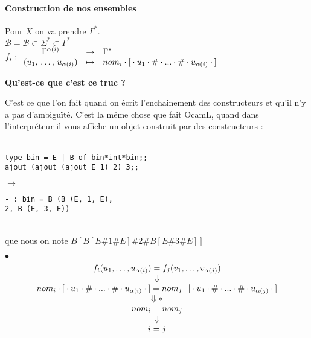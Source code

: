 \paragraph{Construction de nos ensembles}

Pour $X$ on va prendre $\Gamma^*$.\\

$\mathcal B = \mathcal B \subset \Sigma^* \subset \Gamma^*$\\

$f_i : \begin{array}{cll}
	\Gamma^{\alpha(i)} & \to & \Gamma^*\\
	(u_1, \, \dots, \, u_{\alpha(i)}) & \mapsto & nom_i \cdot \text [ \cdot u_1 \cdot \# \cdot  ... \cdot \# \cdot u_{\alpha(i)} \cdot \text ]
\end{array}$\\

\begin{rem}
\textbf{Qu'est-ce que c'est ce truc ?}

C'est ce que l'on fait quand on écrit l'enchainement des constructeurs et qu'il n'y a pas d'ambiguïté. C'est la même chose que fait OcamL, quand dans l'interpréteur il vous affiche un objet construit par des constructeurs :\\\\
\begin{minipage}{0.5\linewidth}
	\begin{lstlisting}
type bin = E | B of bin*int*bin;;
ajout (ajout (ajout E 1) 2) 3;;
\end{lstlisting}
\end{minipage} \enspace $\to$ \enspace \begin{minipage}{0.4\linewidth}
\begin{lstlisting}
- : bin = B (B (E, 1, E),
2, B (E, 3, E))
\end{lstlisting}
\end{minipage}\\que nous on note $B[B[E\#1\#E]\#2\#B[E\#3\#E]]$
\end{rem}
$\bullet$ $$\begin{array}{cl}
 f_i(u_1, \dots, u_{\alpha(i)}) = f_j(v_1, \dots, v_{\alpha(j)})  \\
 \Downarrow \\
  nom_i \cdot \text [ \cdot u_1 \cdot \# \cdot  ... \cdot \# \cdot u_{\alpha(i)} \cdot \text ] = nom_j \cdot \text [ \cdot u_1 \cdot \# \cdot  ... \cdot \# \cdot u_{\alpha(j)} \cdot \text ] \\
  \Downarrow *\\
  nom_i = nom_j \\ \Downarrow \\ i = j
\end{array}$$


